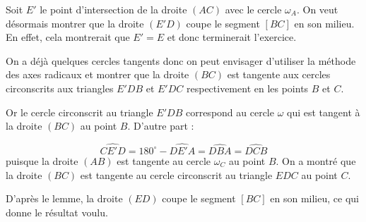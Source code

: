 \begin{sol}
\begin{center}
\end{center}

Soit $E'$ le point d'intersection de la droite $(AC)$ avec le cercle $\omega_A$. On veut désormais montrer que la droite $(E'D)$ coupe le segment $[BC]$ en son milieu. En effet, cela montrerait que $E'=E$ et donc terminerait l'exercice.

On a déjà quelques cercles tangents donc on peut envisager d'utiliser la méthode des axes radicaux et montrer que la droite $(BC)$ est tangente aux cercles circonscrits aux triangles $E'DB$ et $E'DC$ respectivement en les points $B$ et $C$.

Or le cercle circonscrit au triangle $E'DB$ correspond au cercle $\omega$ qui est tangent à la droite $(BC)$ au point $B$. D'autre part :

$$\widehat{CE'D}=180^\circ-\widehat{DE'A}=\widehat{DBA}=\widehat{DCB}$$ puisque la droite $(AB)$ est tangente au cercle $\omega_C$ au point $B$.
On a montré que la droite $(BC)$ est tangente au cercle circonscrit au triangle $EDC$ au point $C$.

D'après le lemme, la droite $(ED)$ coupe le segment $[BC]$ en son milieu, ce qui donne le résultat voulu.
\end{sol}



